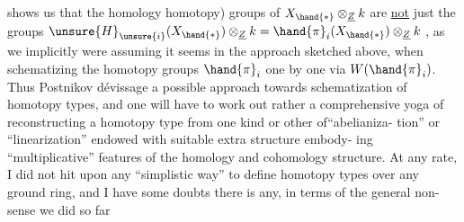 shows us that the homology \deleted{(=} homotopy) groups of $X_{\hand{\ast}}\otimes_{\underline{Z}}k$ are \uline{not} just
the groups $\unsure{H}_{\unsure{i}}(X_{\hand{\ast}})\otimes_{\underline{Z}}k = \hand{\pi}_i(X_{\hand{\ast}})\otimes_{\underline{Z}}k$ , as we implicitly were assuming it
seems in the approach sketched above, when schematizing the homotopy
groups $\hand{\pi}_i$  one by one via $W(\hand{\pi}_i)$. Thus  Postnikov dévissage  
a possible approach towards schematization of homotopy types, and one
will have to work out rather a comprehensive yoga of reconstructing
a homotopy type from  one kind or other of``abelianiza-%
tion'' or ``linearization''  endowed with suitable extra structure embody-%
ing ``multiplicative'' features of the homology and cohomology structure.
At any rate, I did not hit upon any ``simplistic way'' to define homotopy
types over any ground ring, and I have some doubts there is any, in
terms of the general non-sense  we did so far 

